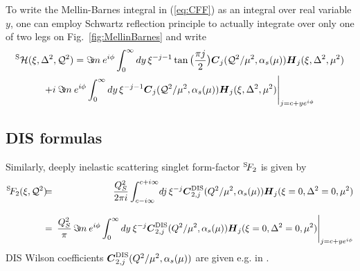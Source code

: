 \documentclass[12pt]{article}
\begin{document}
To write the Mellin-Barnes integral in (\ref{eq:CFF}) as an integral
over real variable $y$, one can employ Schwartz reflection principle to
actually integrate over only one of two legs on Fig.~\ref{fig:MellinBarnes}
and write
\begin{multline}
{^{\rm S}{\cal H}}(\xi,\Delta^2,{\cal Q}^2) =
\Im\! m\:  e^{i\phi} 
\int_{0}^{\infty} dy \, \xi^{-j-1}
\tan\big(\frac{\pi j}{2}\big)
\mbox{\boldmath $C$}_{j}({\cal Q}^2/\mu^2,\alpha_s(\mu)) 
\mbox{\boldmath $H$}_{j} (\xi,\Delta^2,\mu^2) \\
+ i\: \Im\! m\:  e^{i\phi} 
\int_{0}^{\infty} dy \, \xi^{-j-1}
\mbox{\boldmath $C$}_{j}({\cal Q}^2/\mu^2,\alpha_s(\mu)) 
\mbox{\boldmath $H$}_{j} (\xi,\Delta^2,\mu^2) 
\Bigg|_{j = c + y e^{i\phi}}
\label{<Hformula>}
\end{multline}

\subsection{DIS formulas}  
\label{ssect:DIS}

Similarly, deeply inelastic scattering singlet form-factor ${^{\rm S}\!{F_2}}$ is given by
\begin{eqnarray}
{^{\rm S}\!{F_2}}(\xi,{\cal Q}^2)
&\!\!\!=\!\!\!& \frac{Q_{S}^2}{2 \pi i}\int_{c-i \infty}^{c+ i \infty}\!
dj\,\xi^{-j}
\mbox{\boldmath $C$}^{\rm DIS}_{2,j}(Q^2/\mu^2,\alpha_s(\mu))
\mbox{\boldmath $H$}_{j} (\xi=0,\Delta^2=0,\mu^2) \nonumber \\[2ex]
&\!\!\!=\!\!\!& \frac{Q_{S}^2}{\pi}\, \Im\! m\: e^{i\phi}
\int_{0}^{\infty} dy\:  \xi^{-j}
\mbox{\boldmath $C$}^{\rm DIS}_{2,j}(Q^2/\mu^2,\alpha_s(\mu))
\mbox{\boldmath $H$}_{j} (\xi=0,\Delta^2=0,\mu^2) 
\Bigg|_{j = c + y e^{i\phi}}
\label{<F2formula>}
\end{eqnarray}
DIS Wilson coefficients $\mbox{\boldmath $C$}^{\rm DIS}_{2,j}(Q^2/\mu^2,\alpha_s(\mu))$
are given e.g. in \cite{vanNeerven:2000uj}.
\end{document}
